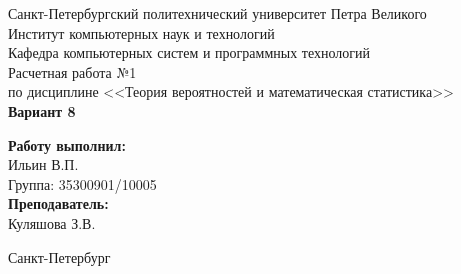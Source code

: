 \begin{titlepage}
    \begin{center}
        \large Санкт-Петербургский политехнический университет Петра Великого\\
        \large Институт компьютерных наук и технологий \\
        \large Кафедра компьютерных систем и программных технологий\\[6cm]


        \huge Расчетная работа №1\\[0.5cm]
        \large по дисциплине <<Теория вероятностей и математическая статистика>>\\[0.1cm]
        \large\textbf{Вариант 8}\\[5cm]
    \end{center}


    \begin{flushright}
        \begin{minipage}{0.25\textwidth}
            \begin{flushleft}

                \large\textbf{Работу выполнил:}\\
                \large Ильин В.П.\\
                \large {Группа:} 35300901/10005\\

                \large \textbf{Преподаватель:}\\
                \large Куляшова З.В.

            \end{flushleft}
        \end{minipage}
    \end{flushright}

    \vfill

    \begin{center}
        \large Санкт-Петербург\\
        \large \the\year
    \end{center}
\end{titlepage}

\vfill
\newpage